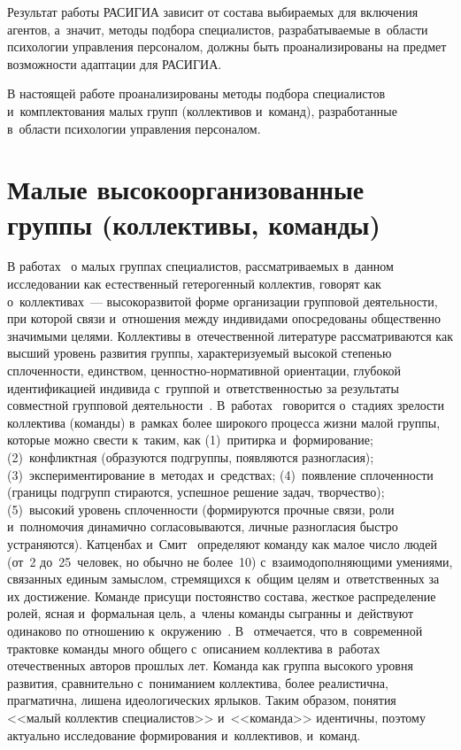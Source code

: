 \begin{multicols}{2}
Результат работы 
\mbox{РАСИГИА} зависит от состава выбираемых для включения агентов, 
а~значит, методы подбора специалистов, разрабатываемые в~об\-ласти 
психологии управ\-ле\-ния персоналом, должны быть проанализированы на 
предмет возможности адаптации для \mbox{РАСИГИА}. 
  
  В настоящей работе проанализированы методы подбора специалистов 
и~комплектования малых групп (коллективов и~команд), разработанные 
в~области психологии управления персоналом.

\section{Малые высокоорганизованные группы (коллективы, 
команды)} 
  
  В работах~\cite{4-r, 5-r, 6-r, 7-r} о малых группах специалистов, 
рассматриваемых в~данном исследовании как естественный гетерогенный 
коллектив, говорят как о~коллективах~--- высокоразвитой форме организации 
групповой дея\-тель\-ности, при которой связи и~отношения между индивидами 
опосредованы общественно значимыми целями. Коллективы в~отечественной 
литературе рас\-смат\-ри\-ва\-ют\-ся как высший уровень развития группы, 
ха\-рак\-те\-ри\-зу\-емый\linebreak
 высокой степенью спло\-чен\-ности, единством,  
цен\-ност\-но-нор\-ма\-тив\-ной ориентации, глубокой идентификацией 
индивида с~группой и~от\-вет\-ст\-вен\-ностью за результаты совместной групповой 
\mbox{деятельности}~\cite{5-r}. В~работах~\cite{8-r, 9-r, 10-r} говорится о~стадиях 
зрелости коллектива (команды) в~рамках более широкого процесса жизни 
малой группы, которые можно свес\-ти к~таким, как (1)~притирка 
и~формирование; (2)~конфликтная (образуются подгруппы, появляются 
разногласия); (3)~экспериментирование в~методах и~средствах; (4)~появление 
спло\-чен\-ности (границы подгрупп стираются, успешное решение задач, 
творчество); (5)~высокий уровень спло\-чен\-ности (формируются прочные связи, 
роли и~полномочия динамично согласовываются, личные разногласия быст\-ро 
устраняются). Катценбах и~Смит~\cite{11-r} определяют команду как 
малое чис\-ло людей (от~2 до~25~человек, но обычно не более~10) 
с~взаимодополняющими умениями, связанных единым за\-мыс\-лом, стремящихся 
к~общим целям и~ответственных за их достижение. Команде присущи 
постоянство со\-ста\-ва, жест\-кое распределение ролей, ясная и~формальная цель, 
а~члены команды сыгранны и~действуют одинаково по отношению 
к~окру\-же\-нию~\cite{12-r}. В~\cite{4-r} отмечается, что в~современной трактовке 
команды много общего с~описанием коллектива в~работах отечественных 
авторов прош\-лых лет. Команда как группа высокого уровня развития, 
сравнительно с~пониманием коллектива, более реалистична, прагматична, 
лишена идеологических ярлыков. Таким образом, понятия <<малый коллектив 
специалистов>> и~<<команда>> идентичны, поэтому актуально исследование 
формирования и~коллективов, и~команд. 
  

\end{multicols}

